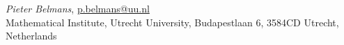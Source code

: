 \documentclass[a4paper,11pt]{article}
\title{}
\author{Pieter Belmans}
\begin{document}
\maketitle


\begin{abstract}
\end{abstract}

\printbibliography

\emph{Pieter Belmans}, \url{p.belmans@uu.nl} \\
Mathematical Institute, Utrecht University, Budapestlaan 6, 3584CD Utrecht, Netherlands
\end{document}
